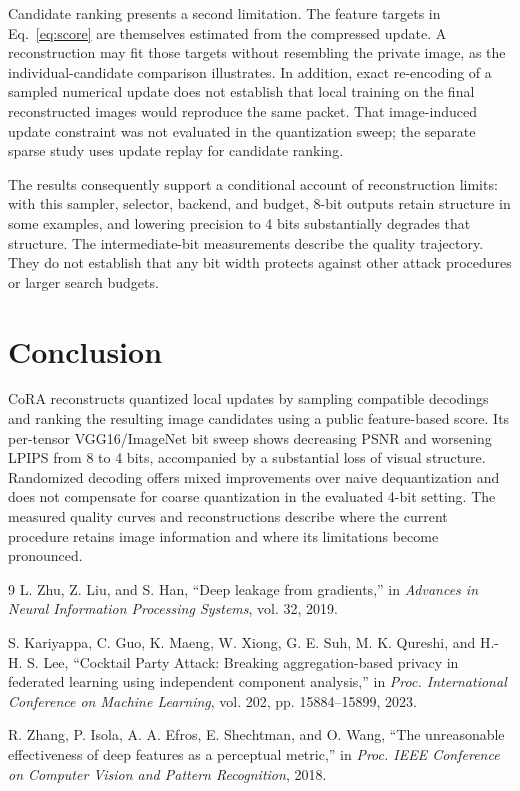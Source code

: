 \documentclass{article}
\newcommand{\cora}{CoRA}
\begin{document}
Candidate ranking presents a second limitation. The feature targets in
Eq.~\ref{eq:score} are themselves estimated from the compressed update.
A reconstruction may fit those targets without resembling the private
image, as the individual-candidate comparison illustrates. In addition,
exact re-encoding of a sampled numerical update does not establish that
local training on the final reconstructed images would reproduce the
same packet. That image-induced update constraint was not evaluated in
the quantization sweep; the separate sparse study uses update replay
for candidate ranking.

The results consequently support a conditional account of reconstruction
limits: with this sampler, selector, backend, and budget, 8-bit outputs
retain structure in some examples, and lowering precision to 4 bits
substantially degrades that structure. The intermediate-bit measurements
describe the quality trajectory. They do not establish that any bit
width protects against other attack procedures or larger search budgets.

\section{Conclusion}
\cora{} reconstructs quantized local updates by sampling compatible
decodings and ranking the resulting image candidates using a public
feature-based score. Its per-tensor VGG16/ImageNet bit sweep shows
decreasing PSNR and worsening LPIPS from 8 to 4 bits, accompanied by a
substantial loss of visual structure. Randomized decoding offers mixed
improvements over naive dequantization and does not compensate for
coarse quantization in the evaluated 4-bit setting. The measured quality
curves and reconstructions describe where the current procedure retains
image information and where its limitations become pronounced.

\begin{thebibliography}{9}
L. Zhu, Z. Liu, and S. Han,
``Deep leakage from gradients,''
in \emph{Advances in Neural Information Processing Systems}, vol. 32, 2019.

S. Kariyappa, C. Guo, K. Maeng, W. Xiong, G. E. Suh,
M. K. Qureshi, and H.-H. S. Lee,
``Cocktail Party Attack: Breaking aggregation-based privacy in federated
learning using independent component analysis,''
in \emph{Proc. International Conference on Machine Learning},
vol. 202, pp. 15884--15899, 2023.

R. Zhang, P. Isola, A. A. Efros, E. Shechtman, and O. Wang,
``The unreasonable effectiveness of deep features as a perceptual metric,''
in \emph{Proc. IEEE Conference on Computer Vision and Pattern Recognition},
2018.
\end{thebibliography}
\end{document}
